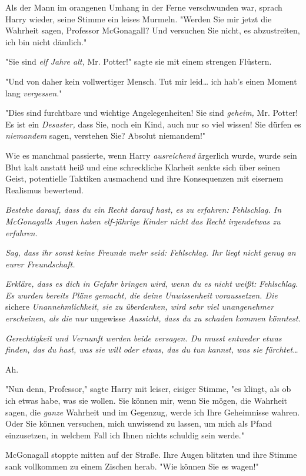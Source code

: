 {Als der Mann im orangenen Umhang in der Ferne verschwunden war, sprach Harry wieder, seine Stimme ein leises Murmeln. "Werden Sie mir jetzt die Wahrheit sagen, Professor McGonagall? Und versuchen Sie nicht, es abzustreiten, ich bin nicht dämlich."

"Sie sind \emph{elf Jahre alt,} Mr. Potter!" sagte sie mit einem strengen Flüstern.

"Und von daher kein vollwertiger Mensch. Tut mir leid… ich hab's einen Moment lang \emph{vergessen.}"

"Dies sind furchtbare und wichtige Angelegenheiten! Sie sind \emph{geheim,} Mr. Potter! Es ist ein \emph{Desaster,} dass Sie, noch ein Kind, auch nur so viel wissen! Sie dürfen es \emph{niemandem} sagen, verstehen Sie? Absolut niemandem!"

Wie es manchmal passierte, wenn Harry \emph{ausreichend} ärgerlich wurde, wurde sein Blut kalt anstatt heiß und eine schreckliche Klarheit senkte sich über seinen Geist, potentielle Taktiken ausmachend und ihre Konsequenzen mit eisernem Realismus bewertend.

\emph{Bestehe darauf, dass du ein Recht darauf hast, es zu erfahren: Fehlschlag. In McGonagalls Augen haben elf-jährige Kinder nicht das Recht irgendetwas zu erfahren.}

\emph{Sag, dass ihr sonst keine Freunde mehr seid: Fehlschlag. Ihr liegt nicht genug an eurer Freundschaft.}

\emph{Erkläre, dass es dich in Gefahr bringen wird, wenn du es nicht weißt: Fehlschlag. Es wurden bereits Pläne gemacht, die deine Unwissenheit voraussetzen. Die} sichere \emph{Unannehmlichkeit, sie zu überdenken, wird sehr viel unangenehmer erscheinen, als die nur} ungewisse \emph{Aussicht, dass du zu schaden kommen könntest.}

\emph{Gerechtigkeit und Vernunft werden beide versagen. Du musst entweder etwas finden, das du hast, was sie will oder etwas, das du tun kannst, was sie fürchtet…}

Ah.

"Nun denn, Professor," sagte Harry mit leiser, eisiger Stimme, "es klingt, als ob ich etwas habe, was sie wollen. Sie können mir, wenn Sie mögen, die Wahrheit sagen, die \emph{ganze} Wahrheit und im Gegenzug, werde ich Ihre Geheimnisse wahren. Oder Sie können versuchen, mich unwissend zu lassen, um mich als Pfand einzusetzen, in welchem Fall ich Ihnen nichts schuldig sein werde."

McGonagall stoppte mitten auf der Straße. Ihre Augen blitzten und ihre Stimme sank vollkommen zu einem Zischen herab. "Wie können Sie es wagen!"

}
